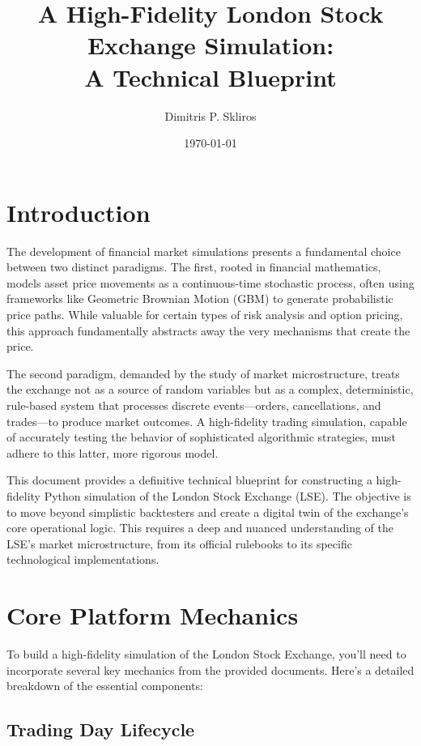 \documentclass[12pt]{article}
\title{A High-Fidelity London Stock Exchange Simulation: \\ A Technical Blueprint}
\author{Dimitris P. Skliros}
\date{\today}
\begin{document}
\maketitle

\tableofcontents

\newpage

\section{Introduction}

The development of financial market simulations presents a fundamental choice between two distinct paradigms. The first, rooted in financial mathematics, models asset price movements as a continuous-time stochastic process, often using frameworks like Geometric Brownian Motion (GBM) to generate probabilistic price paths. While valuable for certain types of risk analysis and option pricing, this approach fundamentally abstracts away the very mechanisms that create the price.

The second paradigm, demanded by the study of market microstructure, treats the exchange not as a source of random variables but as a complex, deterministic, rule-based system that processes discrete events—orders, cancellations, and trades—to produce market outcomes. A high-fidelity trading simulation, capable of accurately testing the behavior of sophisticated algorithmic strategies, must adhere to this latter, more rigorous model.

This document provides a definitive technical blueprint for constructing a high-fidelity Python simulation of the London Stock Exchange (LSE). The objective is to move beyond simplistic backtesters and create a digital twin of the exchange's core operational logic. This requires a deep and nuanced understanding of the LSE's market microstructure, from its official rulebooks to its specific technological implementations.

\section{Core Platform Mechanics}

To build a high-fidelity simulation of the London Stock Exchange, you'll need to incorporate several key mechanics from the provided documents. Here's a detailed breakdown of the essential components:

\subsection{Trading Day Lifecycle}
\end{document}
